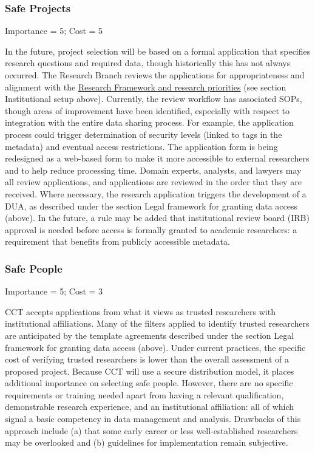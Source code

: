 \documentclass[
]{WileySix}
\begin{document}
\hypertarget{safe-projects-6}{%
\subsubsection{Safe Projects}\label{safe-projects-6}}

Importance = 5; Cost = 5

In the future, project selection will be based on a formal application that specifies research questions and required data, though historically this has not always occurred. The Research Branch reviews the applications for appropriateness and alignment with the \href{http://osf.io/2a7ev}{Research Framework and research priorities} (see section Institutional setup above). Currently, the review workflow has associated SOPs, though areas of improvement have been identified, especially with respect to integration with the entire data sharing process. For example, the application process could trigger determination of security levels (linked to tags in the metadata) and eventual access restrictions. The application form is being redesigned as a web-based form to make it more accessible to external researchers and to help reduce processing time. Domain experts, analysts, and lawyers may all review applications, and applications are reviewed in the order that they are received. Where necessary, the research application triggers the development of a DUA, as described under the section Legal framework for granting data access (above). In the future, a rule may be added that institutional review board (IRB) approval is needed before access is formally granted to academic researchers: a requirement that benefits from publicly accessible metadata.

\hypertarget{safe-people-6}{%
\subsubsection{Safe People}\label{safe-people-6}}

Importance = 5; Cost = 3

CCT accepts applications from what it views as trusted researchers with institutional affiliations. Many of the filters applied to identify trusted researchers are anticipated by the template agreements described under the section Legal framework for granting data access (above). Under current practices, the specific cost of verifying trusted researchers is lower than the overall assessment of a proposed project. Because CCT will use a secure distribution model, it places additional importance on selecting safe people. However, there are no specific requirements or training needed apart from having a relevant qualification, demonstrable research experience, and an institutional affiliation: all of which signal a basic competency in data management and analysis. Drawbacks of this approach include (a) that some early career or less well-established researchers may be overlooked and (b) guidelines for implementation remain subjective.
\end{document}
